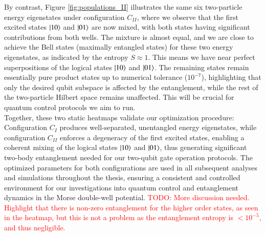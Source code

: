 \documentclass{subfiles}
\begin{document}
By contrast, Figure \ref{fig:populations_II} illustrates the same six two-particle energy eigenstates under configuration $C_{II}$, where we observe that the first excited states $\ket{10}$ and $\ket{01}$ are now mixed, with both states having significant contributions from both wells. The mixture is almost equal, and we are close to achieve the Bell states (maximally entangled states) for these two energy eigenstates, as indicated by the entropy $S \approx 1$. This means we have near perfect superpositions of the logical states $\ket{10}$ and $\ket{01}$. The remaining states remain essentially pure product states up to numerical tolerance ($10^{-7}$), highlighting that only the desired qubit subspace is affected by the entanglement, while the rest of the two-particle Hilbert space remains unaffected. This will be crucial for quantum control protocols we aim to run.
\\

Together, these two static heatmaps validate our optimization procedure: Configuration $C_I$ produces well-separated, unentangled energy eigenstates, while configuration $C_{II}$ enforces a degeneracy of the first excited states, enabling a coherent mixing of the logical states $\ket{10}$ and $\ket{01}$, thus generating significant two-body entanglement needed for our two-qubit gate operation protocols. The optimized parameters for both configurations are used in all subsequent analyses and simulations throughout the thesis, ensuring a consistent and controlled environment for our investigations into quantum control and entanglement dynamics in the Morse double-well potential. \textcolor{red}{TODO: More discussion needed. Highlight that there is non-zero entanglement for the higher order states, as seen in the heatmap, but this is not a problem as the entanglement entropy is $< 10^{-5}$, and thus negligible. }
\end{document}

